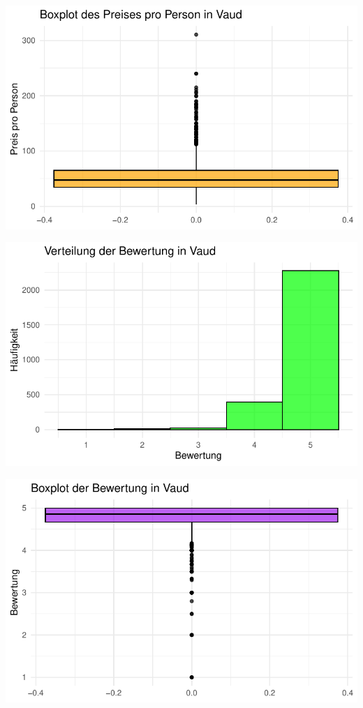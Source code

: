 \documentclass[
  journal,
]{IEEEtran}%
\begin{document}
\includegraphics{main_files/figure-pdf/descriptive vaud-2.pdf}

\includegraphics{main_files/figure-pdf/descriptive vaud-3.pdf}

\includegraphics{main_files/figure-pdf/descriptive vaud-4.pdf}
\end{document}
